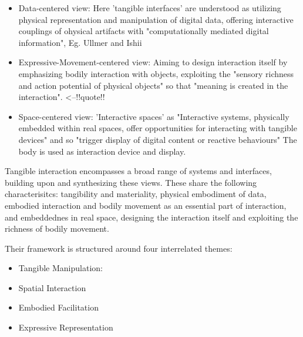 \begin{itemize}
\item Data-centered view: Here 'tangible interfaces' are understood as utilizing physical representation and manipulation of digital data, offering interactive couplings of ohysical artifacts with "computationally mediated digital information", Eg. Ullmer and Ishii
\item Expressive-Movement-centered view: Aiming to design interaction itself by emphasizing bodily interaction with objects, exploiting the "sensory richness and action potential of physical objects" so that "meaning is created in the interaction". <--!!quote!!
\item Space-centered view: 'Interactive spaces' as "Interactive systems, physically embedded within real spaces, offer opportunities for interacting with tangible devices" and so "trigger display of digital content or reactive behaviours" The body is used as interaction device and display.
\end{itemize}

Tangible interaction encompasses a broad range of systems and interfaces, building upon and synthesizing these views. These share the following characterisitcs: tangibility and materiality, physical embodiment of data, embodied interaction and bodily movement as an essential part of interaction, and embeddednes in real space, designing the interaction itself and exploiting the richness of bodily movement.

Their framework is structured around four interrelated themes:

\begin{itemize}
\item Tangible Manipulation:  
\item Spatial Interaction
\item Embodied Facilitation
\item Expressive Representation
\end{itemize}



